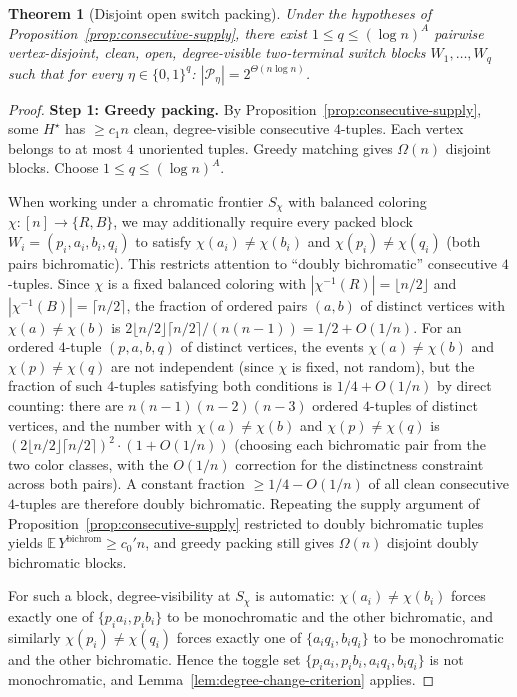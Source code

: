 \documentclass[11pt]{article}
\newtheorem{theorem}{Theorem}[section]
\begin{document}
\begin{theorem}[Disjoint open switch packing]
\label{thm:disjoint-switch-packing}
Under the hypotheses of Proposition~\ref{prop:consecutive-supply}, there exist
$1 \le q \le (\log n)^A$ pairwise vertex-disjoint, clean, open, degree-visible
two-terminal switch blocks $W_1, \ldots, W_q$ such that for every
$\eta \in \{0,1\}^q$:
$|\mathcal{P}_\eta| = 2^{\Theta(n\log n)}$.
\end{theorem}

\begin{proof}
\textbf{Step 1: Greedy packing.}
By Proposition~\ref{prop:consecutive-supply}, some $H^\star$ has $\ge c_1 n$
clean, degree-visible consecutive $4$-tuples.  Each vertex belongs to at most
$4$ unoriented tuples.  Greedy matching gives $\Omega(n)$ disjoint blocks.
Choose $1 \le q \le (\log n)^A$.

When working under a chromatic frontier $S_\chi$ with balanced coloring
$\chi : [n] \to \{R,B\}$, we may additionally require every packed block
$W_i = (p_i, a_i, b_i, q_i)$ to satisfy $\chi(a_i) \neq \chi(b_i)$ and
$\chi(p_i) \neq \chi(q_i)$ (both pairs bichromatic).  This restricts attention
to ``doubly bichromatic'' consecutive $4$-tuples.  Since $\chi$ is a
fixed balanced coloring with $|\chi^{-1}(R)| = \lfloor n/2 \rfloor$
and $|\chi^{-1}(B)| = \lceil n/2 \rceil$, the fraction of ordered
pairs $(a,b)$ of distinct vertices with $\chi(a) \neq \chi(b)$ is
$2\lfloor n/2\rfloor\lceil n/2\rceil / (n(n{-}1)) = 1/2 + O(1/n)$.
For an ordered $4$-tuple $(p,a,b,q)$ of distinct vertices, the events
$\chi(a) \neq \chi(b)$ and $\chi(p) \neq \chi(q)$ are not independent
(since $\chi$ is fixed, not random), but the fraction of such $4$-tuples
satisfying both conditions is $1/4 + O(1/n)$ by direct counting: there
are $n(n{-}1)(n{-}2)(n{-}3)$ ordered $4$-tuples of distinct vertices, and
the number with $\chi(a) \neq \chi(b)$ and $\chi(p) \neq \chi(q)$ is
$(2 \lfloor n/2 \rfloor \lceil n/2 \rceil)^2 \cdot
(1 + O(1/n))$ (choosing each bichromatic pair from the two color classes,
with the $O(1/n)$ correction for the distinctness constraint across both
pairs).  A constant fraction $\ge 1/4 - O(1/n)$ of all clean
consecutive $4$-tuples are therefore doubly bichromatic.  Repeating the supply argument
of Proposition~\ref{prop:consecutive-supply} restricted to doubly bichromatic
tuples yields $\mathbb{E}\,Y^{\mathrm{bichrom}} \ge c_0' n$, and greedy
packing still gives $\Omega(n)$ disjoint doubly bichromatic blocks.

For such a block, degree-visibility at $S_\chi$ is automatic: $\chi(a_i)
\neq \chi(b_i)$ forces exactly one of $\{p_ia_i, p_ib_i\}$ to be
monochromatic and the other bichromatic, and similarly $\chi(p_i) \neq
\chi(q_i)$ forces exactly one of $\{a_iq_i, b_iq_i\}$ to be monochromatic
and the other bichromatic.  Hence the toggle set $\{p_ia_i, p_ib_i, a_iq_i,
b_iq_i\}$ is not monochromatic, and Lemma~\ref{lem:degree-change-criterion}
applies.


\end{proof}
\end{document}
